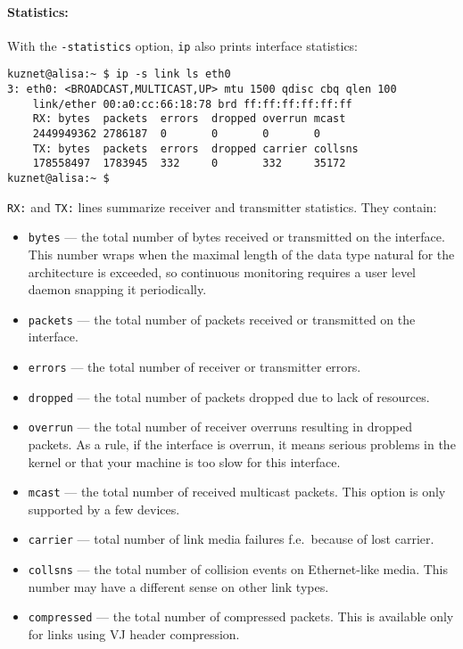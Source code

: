 \paragraph{Statistics:} With the \verb|-statistics| option, \verb|ip| also
prints interface statistics:

\begin{verbatim}
kuznet@alisa:~ $ ip -s link ls eth0
3: eth0: <BROADCAST,MULTICAST,UP> mtu 1500 qdisc cbq qlen 100
    link/ether 00:a0:cc:66:18:78 brd ff:ff:ff:ff:ff:ff
    RX: bytes  packets  errors  dropped overrun mcast   
    2449949362 2786187  0       0       0       0      
    TX: bytes  packets  errors  dropped carrier collsns 
    178558497  1783945  332     0       332     35172  
kuznet@alisa:~ $
\end{verbatim}
\verb|RX:| and \verb|TX:| lines summarize receiver and transmitter
statistics. They contain:
\begin{itemize}
\item \verb|bytes| --- the total number of bytes received or transmitted
on the interface. This number wraps when the maximal length of the data type
natural for the architecture is exceeded, so continuous monitoring requires
a user level daemon snapping it periodically.
\item \verb|packets| --- the total number of packets received or transmitted
on the interface.
\item \verb|errors| --- the total number of receiver or transmitter errors.
\item \verb|dropped| --- the total number of packets dropped due to lack
of resources.
\item \verb|overrun| --- the total number of receiver overruns resulting
in dropped packets. As a rule, if the interface is overrun, it means
serious problems in the kernel or that your machine is too slow
for this interface.
\item \verb|mcast| --- the total number of received multicast packets. This option
is only supported by a few devices.
\item \verb|carrier| --- total number of link media failures f.e.\ because
of lost carrier.
\item \verb|collsns| --- the total number of collision events
on Ethernet-like media. This number may have a different sense on other
link types.
\item \verb|compressed| --- the total number of compressed packets. This is
available only for links using VJ header compression.
\end{itemize}


